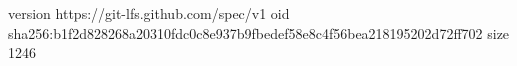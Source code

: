 version https://git-lfs.github.com/spec/v1
oid sha256:b1f2d828268a20310fdc0c8e937b9fbedef58e8c4f56bea218195202d72ff702
size 1246

